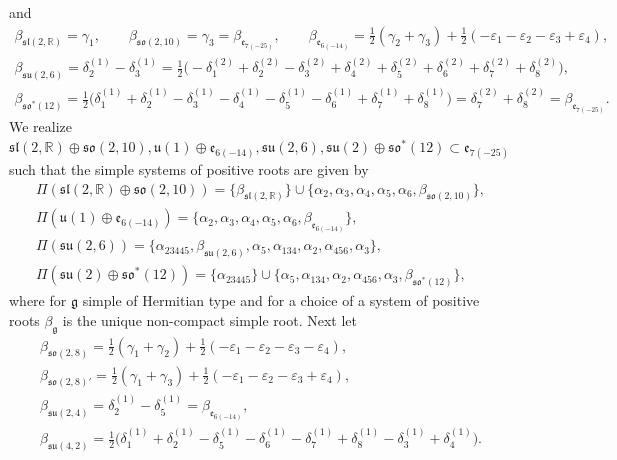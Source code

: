 \documentclass[pdftex]{sigma}
\numberwithin{equation}{section}
\newcommand{\BR}{\mathbb{R}}
\newcommand{\fg}{\mathfrak{g}}
\newcommand{\ve}{\varepsilon}
\begin{document}
and
\begin{gather*}
\beta_{\mathfrak{sl}(2,\BR)} =\gamma_1,\qquad\!\!
\beta_{\mathfrak{so}(2,10)} =\gamma_3=\beta_{\mathfrak{e}_{7(-25)}},\qquad\!\!
\beta_{\mathfrak{e}_{6(-14)}} =\tfrac{1}{2}(\gamma_2+\gamma_3)+\tfrac{1}{2}(-\ve_1-\ve_2-\ve_3+\ve_4),\\
\beta_{\mathfrak{su}(2,6)} =\delta_2^{(1)}-\delta_3^{(1)}
=\tfrac{1}{2}\big({-}\delta_1^{(2)}+\delta_2^{(2)}-\delta_3^{(2)}+\delta_4^{(2)}+\delta_5^{(2)}+\delta_6^{(2)}+\delta_7^{(2)}+\delta_8^{(2)}\big),\\
\beta_{\mathfrak{so}^*(12)}
 =\tfrac{1}{2}\big(\delta_1^{(1)}+\delta_2^{(1)}-\delta_3^{(1)}-\delta_4^{(1)}-\delta_5^{(1)}-\delta_6^{(1)}+\delta_7^{(1)}+\delta_8^{(1)}\big)
=\delta_7^{(2)}+\delta_8^{(2)}=\beta_{\mathfrak{e}_{7(-25)}}.
\end{gather*}
We realize $\mathfrak{sl}(2,\BR)\oplus\mathfrak{so}(2,10),\mathfrak{u}(1)\oplus\mathfrak{e}_{6(-14)},
\mathfrak{su}(2,6),\mathfrak{su}(2)\oplus\mathfrak{so}^*(12)\subset\mathfrak{e}_{7(-25)}$
such that the simple systems of positive roots are given by
\begin{gather*}
\Pi(\mathfrak{sl}(2,\BR)\oplus\mathfrak{so}(2,10)) =\{\beta_{\mathfrak{sl}(2,\BR)}\}
\cup\{\alpha_2,\alpha_3,\alpha_4,\alpha_5,\alpha_6,\beta_{\mathfrak{so}(2,10)}\},\\
\Pi(\mathfrak{u}(1)\oplus\mathfrak{e}_{6(-14)}) =\{\alpha_2,\alpha_3,\alpha_4,\alpha_5,\alpha_6,\beta_{\mathfrak{e}_{6(-14)}}\},\\
\Pi(\mathfrak{su}(2,6)) =\{\alpha_{23445},\beta_{\mathfrak{su}(2,6)},\alpha_5,\alpha_{134},\alpha_2,\alpha_{456},\alpha_3\},\\
\Pi(\mathfrak{su}(2)\oplus\mathfrak{so}^*(12)) =\{\alpha_{23445}\}
\cup\{\alpha_5,\alpha_{134},\alpha_2,\alpha_{456},\alpha_3,\beta_{\mathfrak{so}^*(12)}\},
\end{gather*}
where for $\fg$ simple of Hermitian type and for a choice of a system of positive roots $\beta_{\fg}$ is the unique non-compact simple root.
Next let
\begin{gather*}
\beta_{\mathfrak{so}(2,8)} =\tfrac12 (\gamma_1+\gamma_2)+\tfrac{1}{2}(-\ve_1-\ve_2-\ve_3-\ve_4),\\
\beta_{\mathfrak{so}(2,8)'} =\tfrac12 (\gamma_1+\gamma_3)+\tfrac{1}{2}(-\ve_1-\ve_2-\ve_3+\ve_4),\\
\beta_{\mathfrak{su}(2,4)} =\delta_2^{(1)}-\delta_5^{(1)}=\beta_{\mathfrak{e}_{6(-14)}},\\
\beta_{\mathfrak{su}(4,2)}
 =\tfrac{1}{2}\big(\delta_1^{(1)}+\delta_2^{(1)}-\delta_5^{(1)}-\delta_6^{(1)}-\delta_7^{(1)}+\delta_8^{(1)}-\delta_3^{(1)}+\delta_4^{(1)}\big).
\end{gather*}
\end{document}

